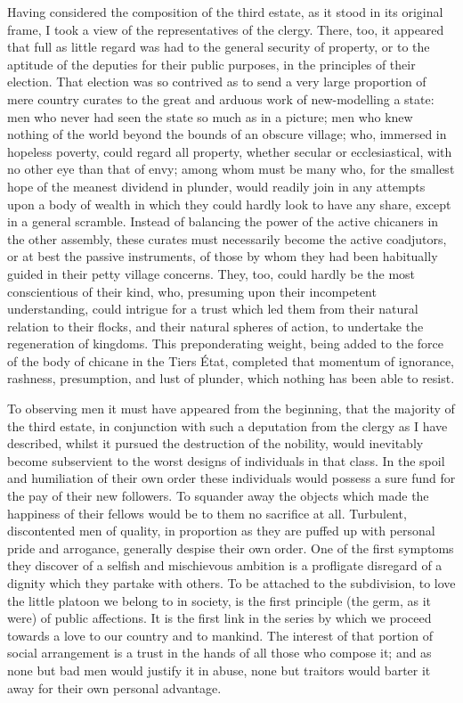 Having considered the composition of the third estate, as it stood in its original frame, I took a view of the representatives of the clergy. There, too, it appeared that full as little regard was had to the general security of property, or to the aptitude of the deputies for their public purposes, in the principles of their election. That election was so contrived as to send a very large proportion of mere country curates to the great and arduous work of new-modelling a state: men who never had seen the state so much as in a picture; men who knew nothing of the world beyond the bounds of an obscure village; who, immersed in hopeless poverty, could regard all property, whether secular or ecclesiastical, with no other eye than that of envy; among whom must be many who, for the smallest hope of the meanest dividend in plunder, would readily join in any attempts upon a body of wealth in which they could hardly look to have any share, except in a general scramble. Instead of balancing the power of the active chicaners in the other assembly, these curates must necessarily become the active coadjutors, or at best the passive instruments, of those by whom they had been habitually guided in their petty village concerns. They, too, could hardly be the most conscientious of their kind, who, presuming upon their incompetent understanding, could intrigue for a trust which led them from their natural relation to their flocks, and their natural spheres of action, to undertake the regeneration of kingdoms. This preponderating weight, being added to the force of the body of chicane in the Tiers État, completed that momentum of ignorance, rashness, presumption, and lust of plunder, which nothing has been able to resist.

To observing men it must have appeared from the beginning, that the majority of the third estate, in conjunction with such a deputation from the clergy as I have described, whilst it pursued the destruction of the nobility, would inevitably become subservient to the worst designs of individuals in that class. In the spoil and humiliation of their own order these individuals would possess a sure fund for the pay of their new followers. To squander away the objects which made the happiness of their fellows would be to them no sacrifice at all. Turbulent, discontented men of quality, in proportion as they are puffed up with personal pride and arrogance, generally despise their own order. One of the first symptoms they discover of a selfish and mischievous ambition is a profligate disregard of a dignity which they partake with others. To be attached to the subdivision, to love the little platoon we belong to in society, is the first principle (the germ, as it were) of public affections. It is the first link in the series by which we proceed towards a love to our country and to mankind. The interest of that portion of social arrangement is a trust in the hands of all those who compose it; and as none but bad men would justify it in abuse, none but traitors would barter it away for their own personal advantage.


